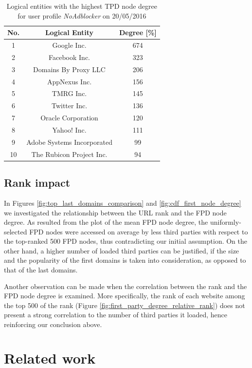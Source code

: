 \documentclass{sig-alternate}
\begin{document}
\begin{table}
  \centering
  \begin{tabular}{|c|c|c|}
  \hline
  No. & Logical Entity & Degree [\%] \\
  \hline
  1 & Google Inc. & 674 \\
  2 & Facebook Inc. & 323 \\
  3 & Domains By Proxy LLC & 206 \\
  4 & AppNexus Inc. & 156 \\
  5 & TMRG Inc. & 145 \\
  6 & Twitter Inc. & 136 \\
  7 & Oracle Corporation & 120 \\
  8 & Yahoo! Inc. & 111 \\
  9 & Adobe Systems Incorporated & 99 \\
  10 & The Rubicon Project Inc. & 94 \\
  \hline
  \end{tabular}
  \caption{Logical entities with the highest TPD node degree for user profile \textit{NoAdblocker} on 20/05/2016}
  \label{table:top_10_tpd_entities}
  \end{table}

\subsection{Rank impact}

In Figures \ref{fig:top_last_domains_comparison} and \ref{fig:cdf_first_node_degree} we investigated the relationship between the URL rank and the FPD node degree. As resulted from the plot of the mean FPD node degree, the uniformly-selected FPD nodes were accessed on average by less third parties with respect to the top-ranked 500 FPD nodes, thus contradicting our initial assumption. On the other hand, a higher number of loaded third parties can be justified, if the size and the popularity of the first domains is taken into consideration, as opposed to that of the last domains.

Another observation can be made when the correlation between the rank and the FPD node degree is examined. More specifically, the rank of each website among the top 500 of the rank (Figure \ref{fig:first_party_degree_relative_rank}) does not present a strong correlation to the number of third parties it loaded, hence reinforcing our conclusion above.

\section{Related work}
\end{document}

